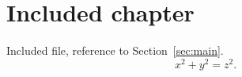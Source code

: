 \section{Included chapter}\label{sec:chapter}
Included file, reference to Section~\ref{sec:main}.
\begin{equation}x^2+y^2=z^2.\end{equation}
